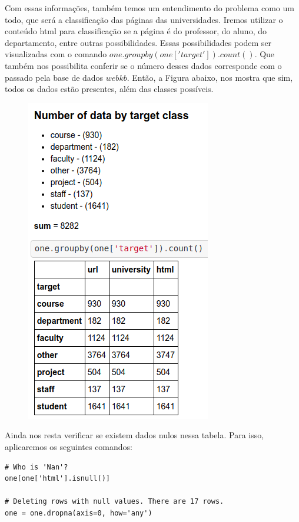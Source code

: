\documentclass [12pt, a4paper] {article}
\begin{document}
Com essas informações, também temos um entendimento do problema como um todo, que será a classificação das páginas das universidades. Iremos utilizar o conteúdo html para classificação se a página é do professor, do aluno, do departamento, entre outras possibilidades. Essas possibilidades podem ser visualizadas com o comando $one.groupby(one['target']).count()$. Que também nos possibilita conferir se o número desses dados corresponde com o passado pela base de dados $webkb$.
Então, a Figura abaixo, nos mostra que sim, todos os dados estão presentes, além das classes possíveis.

\newpage

\begin{figure}[!hbt]
		\begin{center}
		\includegraphics[width=0.6\columnwidth]{figuras/classes.png}
		\end{center}
\end{figure}


Ainda nos resta verificar se existem dados nulos nessa tabela. Para isso, aplicaremos os seguintes comandos:

\begin{lstlisting}
# Who is 'Nan'?
one[one['html'].isnull()]

# Deleting rows with null values. There are 17 rows.
one = one.dropna(axis=0, how='any')
\end{lstlisting}
\end{document}
